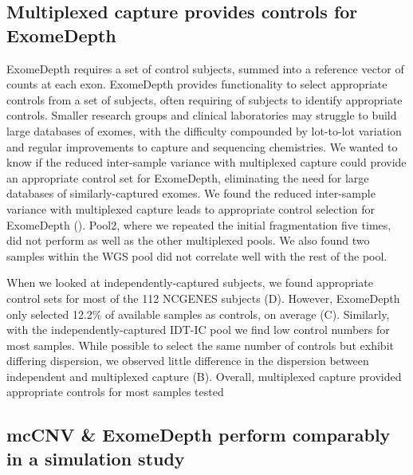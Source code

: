 \documentclass{bmcart}\usepackage[]{graphicx}\usepackage[]{color}
\begin{document}
\subsection{Multiplexed capture provides controls for ExomeDepth}

ExomeDepth requires a set of control subjects, summed into a reference vector of counts at each exon.
ExomeDepth provides functionality to select appropriate controls from a set of subjects, often requiring  of subjects to identify appropriate controls.
Smaller research groups and clinical laboratories may struggle to build large databases of exomes, with the difficulty compounded by lot-to-lot variation and regular improvements to capture and sequencing chemistries.
We wanted to know if the reduced inter-sample variance with multiplexed capture could provide an appropriate control set for ExomeDepth, eliminating the need for large databases of similarly-captured exomes.
We found the reduced inter-sample variance with multiplexed capture leads to appropriate control selection for ExomeDepth ().
Pool2, where we repeated the initial fragmentation five times, did not perform as well as the other multiplexed pools.
We also found two samples within the WGS pool did not correlate well with the rest of the pool.

When we looked at independently-captured subjects, we found appropriate control sets for most of the 112 NCGENES subjects (D).
However, ExomeDepth only selected 12.2\% of available samples as controls, on average (C).
Similarly, with the independently-captured IDT-IC pool we find low control numbers for most samples.
While possible to select the same number of controls but exhibit differing dispersion, we observed little difference in the dispersion between independent and multiplexed capture (B).
Overall, multiplexed capture provided appropriate controls for most samples tested 

\subsection{mcCNV \& ExomeDepth perform comparably in a simulation study}
\end{document}
